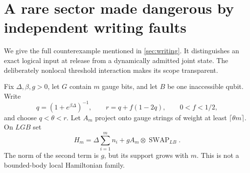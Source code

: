 \documentclass[11pt,reqno]{amsart}
\numberwithin{equation}{section}
\theoremstyle{definition}
\theoremstyle{remark}
\begin{document}
\section{A rare sector made dangerous by independent writing faults}
\label{app:hot-sector}

We give the full counterexample mentioned in \cref{sec:writing}.
It distinguishes an exact logical input at release from a dynamically
admitted joint state. The deliberately nonlocal threshold interaction
makes its scope transparent.

Fix \(\Delta,\beta,g>0\), let \(G\) contain \(m\) gauge bits, and let
\(B\) be one inaccessible qubit. Write
\[
 q=(1+e^{\beta\Delta})^{-1},\qquad
 r=q+f(1-2q),\qquad 0<f<1/2,
\]
and choose \(q<\theta<r\). Let \(A_m\) project onto gauge strings of
weight at least \(\lceil\theta m\rceil\). On \(LGB\) set
\begin{equation}\label{eq:hot-H}
 H_m=\Delta\sum_{i=1}^m n_i+
                   gA_m\otimes\operatorname{SWAP}_{LB}.
\end{equation}
The norm of the second term is \(g\), but its support grows with \(m\).
This is not a bounded-body local Hamiltonian family.
\end{document}
